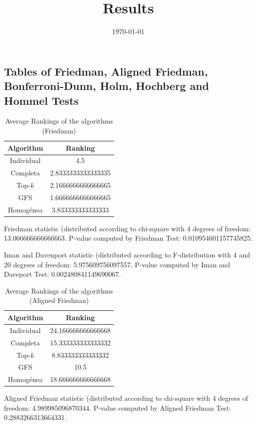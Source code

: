 \documentclass[a4paper,10pt]{article}
\title{Results}
\author{}
\date{\today}
\begin{document}
\begin{landscape}
\oddsidemargin 0in \topmargin 0in\maketitle
\section{Tables of Friedman, Aligned Friedman, Bonferroni-Dunn, Holm, Hochberg and Hommel Tests}
\begin{table}[!htp]
\centering
\caption{Average Rankings of the algorithms (Friedman)
}\begin{tabular}{c|c}
Algorithm&Ranking\\
\hline
Individual&4.5\\
Completa&2.8333333333333335\\
Top-$k$&2.1666666666666665\\
GFS&1.6666666666666665\\
Homogénea&3.833333333333333\\
\end{tabular}
\end{table}


Friedman statistic (distributed according to chi-square with 4 degrees of freedom: 13.066666666666663. 
P-value computed by Friedman Test: 0.010954601157745825.\newline

Iman and Davenport statistic (distributed according to F-distribution with 4 and 20 degrees of freedom: 5.975609756097557. 
P-value computed by Iman and Daveport Test: 0.002480841149690067.\newline


\newpage

\begin{table}[!htp]
\centering
\caption{Average Rankings of the algorithms (Aligned Friedman)
}\begin{tabular}{c|c}
Algorithm&Ranking\\
\hline
Individual&24.166666666666668\\
Completa&15.333333333333332\\
Top-$k$&8.833333333333332\\
GFS&10.5\\
Homogénea&18.666666666666668\\
\end{tabular}
\end{table}


Aligned Friedman statistic (distributed according to chi-square with 4 degrees of freedom: 4.989985096870344. 
P-value computed by Aligned Friedman Test: 0.2883266313664331.\newline



\end{landscape}
\end{document}
